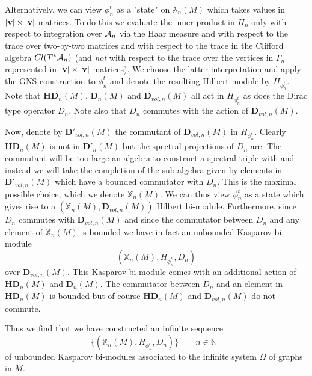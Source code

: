 \documentclass[12pt]{article}
\def\G{\Gamma}
\def\OO{\Omega}
\def\ca{{\cal A}}
\begin{document}
Alternatively, we can view $\phi^t_n$ as a "state" on $\mathbb{A}_n(M) $ which takes values in $\vert {\bf v} \vert \times \vert {\bf v} \vert$ matrices. To do this we evaluate the inner product in $H_n$ only with respect to integration over $\ca_n$ via the Haar measure and with respect to the trace over two-by-two matrices and with respect to the trace in the Clifford algebra $Cl(T^*\ca_n)$ (and {\it not} with respect to the trace over the vertices in $\G_n$ represented in $\vert {\bf v} \vert \times \vert {\bf v} \vert$ matrices). We choose the latter interpretation and apply the GNS construction to $\phi^t_n$ and denote the resulting Hilbert module by $H_{\phi^t_n}$. 
Note that $\mathbf{HD}_n(M) $, $\mathbf{D}_n(M) $ and $\mathbf{D}_{vol,n}(M) $ all act in $H_{\phi^t_n}$ as does the Dirac type operator $D_n$. Note also that $D_n$ commutes with the action of $\mathbf{D}_{vol,n}(M) $.




Now, denote by $\mathbf{D}'_{vol,n}(M) $ the commutant of $\mathbf{D}_{vol,n}(M) $ in $H_{\phi^t_n}$. Clearly $\mathbf{HD}_n(M) $ is not in $\mathbf{D}'_n(M) $ but the spectral projections of $D_n$ are.
%
The commutant will be too large an algebra to construct a spectral triple with and instead we will take the completion of the sub-algebra given by elements in $\mathbf{D}'_{vol,n}(M) $ which have a bounded commutator with $D_n$. This is the maximal possible choice, which we denote $\mathbb{X}_n(M)$.
%
%
We can thus view ${\phi^t_n}$ as a state which gives rise to a $(\mathbb{X}_n(M) ,\mathbf{D}_{vol,n}(M) )$ Hilbert bi-module. Furthermore, since $D_n$ commutes with $\mathbf{D}_{vol,n}(M) $ and since the commutator between $D_n$ and any element of $\mathbb{X}_{n}(M) $ is bounded we have in fact an unbounded Kasparov bi-module 
$$( \mathbb{X}_n(M)  ,  H_{\phi^t_n} ,D_n )$$
over $\mathbf{D}_{vol,n}(M) $. This Kasparov bi-module comes with an additional action of $\mathbf{HD}_n(M) $ and $\mathbf{D}_n(M) $. The commutator between $D_n$ and an element in $\mathbf{HD}_n(M) $ is bounded but of course $\mathbf{HD}_n(M) $ and $\mathbf{D}_{vol,n}(M) $ do not commute.

Thus we find that we have constructed an infinite sequence 
\begin{equation}
\{    (  \mathbb{X}_n(M)  ,  H_{\phi^t_n} ,D_n )   \} \qquad  n\in\mathbb{N}_+
\label{grantree}
\end{equation}
of unbounded Kasparov bi-modules associated to the infinite system $\OO$ of graphs in $M$. 
\end{document}
